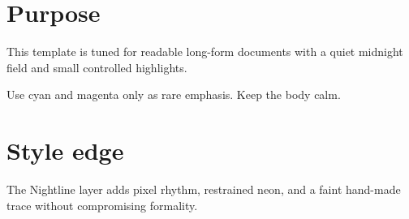 \documentclass[11pt]{article}
\begin{document}
\color{arMist}
\pagecolor{arObs}

\section{Purpose}
This template is tuned for readable long-form documents with a quiet midnight field and small
controlled highlights.

\begin{tcolorbox}
Use cyan and magenta only as rare emphasis. Keep the body calm.
\end{tcolorbox}

\section{Style edge}
The Nightline layer adds pixel rhythm, restrained neon, and a faint hand-made trace without
compromising formality.
\end{document}
